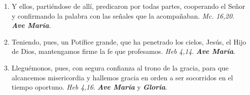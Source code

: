 \documentclass[../../devocionario.tex]{subfiles}
\begin{document}
\begin{enumerate}
        \item Y ellos, partiéndose de allí, predicaron por todas partes, cooperando el Señor y confirmando la palabra con las señales que la acompañaban. 
            \emph{Mc. 16,20}. \textbf{\emph{Ave María}}.

        \item Teniendo, pues, un Potífice grande, que ha penetrado los cielos, Jesús, el Hijo de Dios, mantengamos firme la fe que profesamos. 
            \emph{Heb 4,14}. \textbf{\emph{Ave María}}.

        \item Lleguémonos, pues, con segura confianza al trono de la gracia, para que alcancemos misericordia y hallemos gracia en orden a ser socorridos en el tiempo oportuno. 
            \emph{Heb 4,16}. \textbf{\emph{Ave María}} y \textbf{\emph{Gloria}}.

    \end{enumerate}
\end{document}
